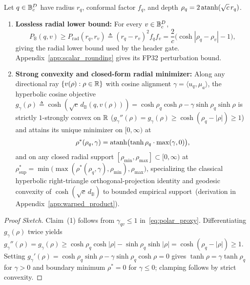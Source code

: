 \begin{proposition}
\label{prop:geodesic_apex}
Let $q \in \mathbb{B}_c^D$ have radius $r_q$, conformal factor $f_q$, and depth $\rho_q = 2\operatorname{atanh}(\sqrt{c}\,r_q)$.
\begin{enumerate}
  \item \textbf{Lossless radial lower bound:}
  For every $v \in \mathbb{B}_c^D$,
  \begin{equation}
    P_{\mathbb{B}}(q, v) \ge P_{\mathrm{rad}}(r_q, r_v) \triangleq (r_q - r_v)^2 f_q f_v = \frac{2}{c}\bigl(\cosh|\rho_q - \rho_v| - 1\bigr),
    \label{eq:radial_lb}
  \end{equation}
  giving the radial lower bound used by the header gate. \ifpreprint Appendix~\ref{app:scalar_rounding} gives its FP32 perturbation bound.\fi

  \item \textbf{Strong convexity and closed-form radial minimizer:}
  Along any directional ray $\{v(\rho) : \rho \in \mathbb{R}\}$ with cosine alignment $\gamma = \langle u_q, \mu_a\rangle$, the hyperbolic cosine objective $g_\gamma(\rho) \triangleq \cosh(\sqrt{c}\,d_{\mathbb{B}}(q, v(\rho))) = \cosh\rho_q\cosh\rho - \gamma\sinh\rho_q\sinh\rho$ is strictly $1$-strongly convex on $\mathbb{R}$ ($g_\gamma''(\rho) = g_\gamma(\rho) \ge \cosh(\rho_q - |\rho|) \ge 1$) and attains its unique minimizer on $[0, \infty)$ at
  \begin{equation}
    \rho^*(\rho_q, \gamma) = \operatorname{atanh}\bigl(\tanh\rho_q \cdot \max(\gamma, 0)\bigr),
    \label{eq:geodesic_apex}
  \end{equation}
  and on any closed radial support $[\rho_{\min}, \rho_{\max}] \subset [0, \infty)$ at $\rho_{\mathrm{sup}}^* = \min\bigl(\max(\rho^*(\rho_q, \gamma), \rho_{\min}), \rho_{\max}\bigr)$, specializing the classical hyperbolic right-triangle orthogonal-projection identity and geodesic convexity of $\cosh(\sqrt{c}\,d_{\mathbb{B}})$ to bounded empirical support\ifpreprint\ (derivation in Appendix~\ref{app:warped_product})\fi.
\end{enumerate}
\end{proposition}

\begin{proof}[Proof Sketch]
Claim~(1) follows from $\gamma_{qv} \le 1$ in~\eqref{eq:polar_proxy}.
Differentiating $g_\gamma(\rho)$ twice yields $g_\gamma''(\rho) = g_\gamma(\rho) \ge \cosh\rho_q\cosh|\rho| - \sinh\rho_q\sinh|\rho| = \cosh(\rho_q - |\rho|) \ge 1$.
Setting $g_\gamma'(\rho) = \cosh\rho_q\sinh\rho - \gamma\sinh\rho_q\cosh\rho = 0$ gives $\tanh\rho = \gamma\tanh\rho_q$ for $\gamma > 0$ and boundary minimum $\rho^* = 0$ for $\gamma \le 0$; clamping follows by strict convexity.
\end{proof}

